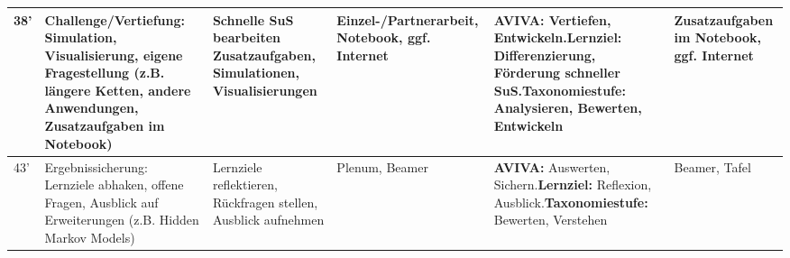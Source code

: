 \begin{landscape}
\begin{longtable}{@{}l|p{5cm}|p{5cm}|p{4cm}|p{5cm}|p{5cm}@{}}
            38' & Challenge/Vertiefung: Simulation, Visualisierung, eigene Fragestellung (z.B. längere Ketten, andere Anwendungen, Zusatzaufgaben im Notebook) & Schnelle SuS bearbeiten Zusatzaufgaben, Simulationen, Visualisierungen & Einzel-/Partnerarbeit, Notebook, ggf. Internet & \textbf{AVIVA:} Vertiefen, Entwickeln.\newline\textbf{Lernziel:} Differenzierung, Förderung schneller SuS.\newline\textbf{Taxonomiestufe:} Analysieren, Bewerten, Entwickeln & Zusatzaufgaben im Notebook, ggf. Internet \\\midrule
            43' & Ergebnissicherung: Lernziele abhaken, offene Fragen, Ausblick auf Erweiterungen (z.B. Hidden Markov Models) & Lernziele reflektieren, Rückfragen stellen, Ausblick aufnehmen & Plenum, Beamer & \textbf{AVIVA:} Auswerten, Sichern.\newline\textbf{Lernziel:} Reflexion, Ausblick.\newline\textbf{Taxonomiestufe:} Bewerten, Verstehen & Beamer, Tafel \\\midrule
        \end{longtable}
\end{landscape}
\restoregeometry